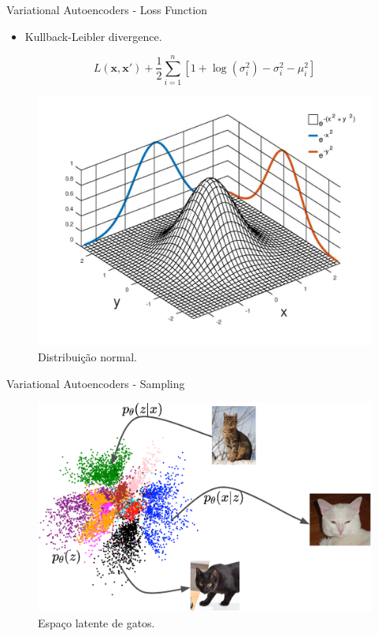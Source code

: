 \documentclass[dvipsnames]{beamer}
\begin{document}
\begin{frame}{Variational Autoencoders - Loss Function}
    \begin{itemize}
        \item Kullback-Leibler divergence.
    \end{itemize}

    $$L(\boldsymbol{x}, \boldsymbol{x'}) + \frac{1}{2} \sum_{i = 1}^{n}\left[ 1 + \log(\sigma_i^2) - \sigma_i^2 - \mu_i^2 \right]$$

    \begin{figure}
        \centering
        \includegraphics[scale=0.15]{img/normal.jpg}
        \caption{Distribuição normal.}
    \end{figure}

\end{frame}

\begin{frame}{Variational Autoencoders - Sampling}

    \begin{figure}
        \centering
        \includegraphics[scale=0.12]{img/latentcat.png}
        \caption{Espaço latente de gatos.}
    \end{figure}

\end{frame}
\end{document}
